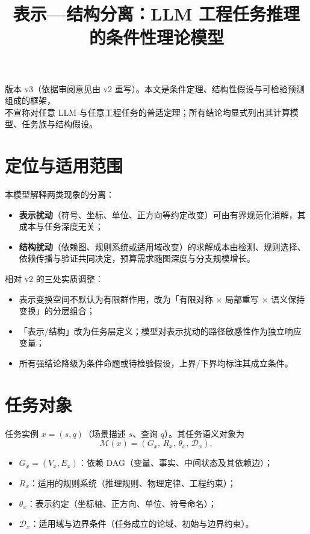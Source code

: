 \documentclass[11pt]{ctexart}
\title{\textbf{表示—结构分离：LLM 工程任务推理的条件性理论模型}}
\date{}
\author{}
\begin{document}
\maketitle

\begin{center}
\small 版本 v3（依据审阅意见由 v2 重写）。本文是条件定理、结构性假设与可检验预测组成的框架，\\不宣称对任意 LLM 与任意工程任务的普适定理；所有结论均显式列出其计算模型、任务族与结构假设。
\end{center}

\section{定位与适用范围}

本模型解释两类现象的分离：
\begin{itemize}
  \item \textbf{表示扰动}（符号、坐标、单位、正方向等约定改变）可由有界规范化消解，其成本与任务深度无关；
  \item \textbf{结构扰动}（依赖图、规则系统或适用域改变）的求解成本由检测、规则选择、依赖传播与验证共同决定，预算需求随图深度与分支规模增长。
\end{itemize}

相对 v2 的三处实质调整：
\begin{itemize}
  \item 表示变换空间不默认为有限群作用，改为「有限对称 $\times$ 局部重写 $\times$ 语义保持变换」的分层组合；
  \item 「表示/结构」改为任务层定义；模型对表示扰动的路径敏感性作为独立响应变量；
  \item 所有强结论降级为条件命题或待检验假设，上界/下界均标注其成立条件。
\end{itemize}

\section{任务对象}

任务实例 $x=(s,q)$（场景描述 $s$、查询 $q$）。其任务语义对象为
\[
  \mathcal{M}(x) = (G_x,\, R_x,\, \theta_x,\, \mathcal{D}_x),
\]
\begin{itemize}
  \item $G_x=(V_x,E_x)$：依赖 DAG（变量、事实、中间状态及其依赖边）；
  \item $R_x$：适用的规则系统（推理规则、物理定律、工程约束）；
  \item $\theta_x$：表示约定（坐标轴、正方向、单位、符号命名）；
  \item $\mathcal{D}_x$：适用域与边界条件（任务成立的论域、初始与边界约束）。
\end{itemize}
\end{document}
